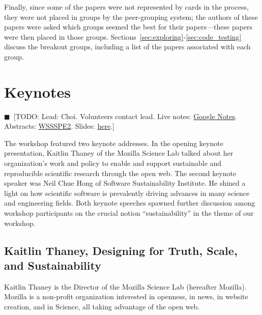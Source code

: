 \documentclass[11pt, oneside]{amsart}
\newcommand{\todo}[1]{{\color{blue}$\blacksquare$~\textsf{[TODO: #1]}}}
\begin{document}
Finally, since some of the papers were not represented by cards in the process,
they were not placed in groups by the peer-grouping system; the authors of
these papers were asked which groups seemed the best for their papers---these
papers were then placed in those groups. Sections~\ref{sec:exploring}-\ref{sec:code_testing}
discuss the breakout groups, including a list of the papers associated with each
group.


\section{Keynotes} \label{sec:keynotes}
\todo{\footnotesize{Lead: Choi. Volunteers contact lead. Live notes: \href{http://tinyurl.com/q6ew45v}{Google Notes}}.
Abstracts: \href{http://tinyurl.com/mnenzms}{WSSSPE2}. Slides: \href{http://tinyurl.com/las8tsq}{here}.}

The workshop featured two keynote addresses. In the opening keynote
presentation, Kaitlin Thaney of the Mozilla Science Lab talked about her
organization's work and policy to enable and support sustainable and
reproducible scientific research through the open web. The second keynote
speaker was Neil Chue Hong of Software Sustainability Institute. He shined a
light on how scientific software is prevalently driving advances in many science
and engineering fields. Both keynote speeches spawned further discussion among
workshop participants on the crucial notion ``sustainability'' in the theme of
our workshop.

\subsection{Kaitlin Thaney, Designing for Truth, Scale, and Sustainability}
\label{keynote1}

Kaitlin Thaney is the Director of the Mozilla Science Lab (hereafter Mozilla).
Mozilla is a non-profit organization interested in openness, in news, in website
creation, and in Science, all taking advantage of the open web. 
\end{document}
